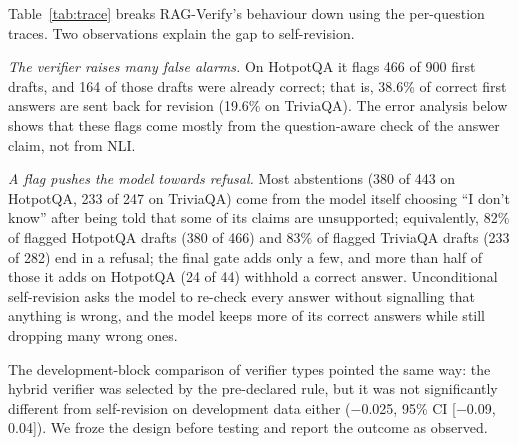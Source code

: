 \documentclass[conference]{IEEEtran}
\begin{document}
Table~\ref{tab:trace} breaks RAG-Verify's behaviour down using the per-question traces. Two observations explain the gap to self-revision.

\emph{The verifier raises many false alarms.} On HotpotQA it flags 466 of 900 first drafts, and 164 of those drafts were already correct; that is, 38.6\% of correct first answers are sent back for revision (19.6\% on TriviaQA). The error analysis below shows that these flags come mostly from the question-aware check of the answer claim, not from NLI.

\emph{A flag pushes the model towards refusal.} Most abstentions (380 of 443 on HotpotQA, 233 of 247 on TriviaQA) come from the model itself choosing ``I don't know'' after being told that some of its claims are unsupported; equivalently, 82\% of flagged HotpotQA drafts (380 of 466) and 83\% of flagged TriviaQA drafts (233 of 282) end in a refusal; the final gate adds only a few, and more than half of those it adds on HotpotQA (24 of 44) withhold a correct answer. Unconditional self-revision asks the model to re-check every answer without signalling that anything is wrong, and the model keeps more of its correct answers while still dropping many wrong ones.

The development-block comparison of verifier types pointed the same way: the hybrid verifier was selected by the pre-declared rule, but it was not significantly different from self-revision on development data either ($-$0.025, 95\% CI [$-$0.09, 0.04]). We froze the design before testing and report the outcome as observed.

\begin{table}[t]
\centering
\caption{Ablations on the first test block only (300 questions per dataset, Qwen2.5-7B). $\Phi_1$ in \%; $\Delta$: paired difference from the reference (full RAG-Verify; standard RAG for the last group) with 95\% bootstrap CI. $^{*}$: CI excludes zero. The $\tau$ and $k$ rows are sensitivity checks only.}
\label{tab:abl}
\setlength{\tabcolsep}{2pt}
\end{table}
\end{document}
